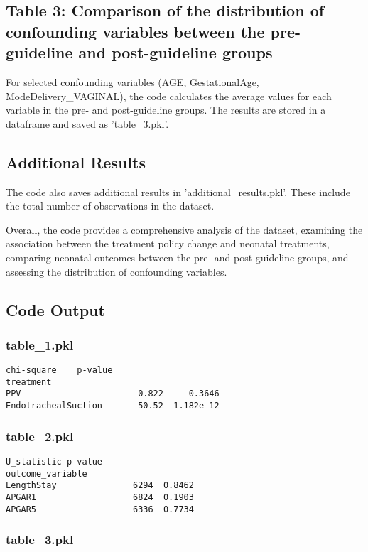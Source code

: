 \documentclass[11pt]{article}
\begin{document}
\subsection{Table 3: Comparison of the distribution of confounding variables between the pre-guideline and post-guideline groups}
For selected confounding variables (AGE, GestationalAge, ModeDelivery\_VAGINAL), the code calculates the average values for each variable in the pre- and post-guideline groups. The results are stored in a dataframe and saved as 'table\_3.pkl'.

\subsection{Additional Results}
The code also saves additional results in 'additional\_results.pkl'. These include the total number of observations in the dataset.

Overall, the code provides a comprehensive analysis of the dataset, examining the association between the treatment policy change and neonatal treatments, comparing neonatal outcomes between the pre- and post-guideline groups, and assessing the distribution of confounding variables.

\subsection{Code Output}

\subsubsection*{table\_1.pkl}

\begin{Verbatim}[tabsize=4]
                     chi-square    p-value
treatment
PPV                       0.822     0.3646
EndotrachealSuction       50.52  1.182e-12
\end{Verbatim}

\subsubsection*{table\_2.pkl}

\begin{Verbatim}[tabsize=4]
                  U_statistic p-value
outcome_variable
LengthStay               6294  0.8462
APGAR1                   6824  0.1903
APGAR5                   6336  0.7734
\end{Verbatim}

\subsubsection*{table\_3.pkl}
\end{document}
